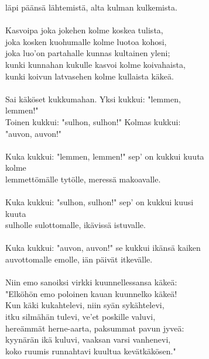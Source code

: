 läpi päänsä lähtemistä, alta kulman kulkemista.                \\
                                                               \\
Kasvoipa joka jokehen kolme koskea tulista,                    \\
joka kosken kuohumalle kolme luotoa kohosi,                    \\
joka luo'on partahalle kunnas kultainen yleni;                 \\
kunki kunnahan kukulle kasvoi kolme koivahaista,               \\
kunki koivun latvasehen kolme kullaista käkeä.                 \\
                                                               \\
Sai käköset kukkumahan. Yksi kukkui: "lemmen,                  \\
lemmen!"                                                       \\
Toinen kukkui: "sulhon, sulhon!" Kolmas kukkui:                \\
"auvon, auvon!"                                                \\
                                                               \\
Kuka kukkui: "lemmen, lemmen!" sep' on kukkui kuuta            \\
kolme                                                          \\
lemmettömälle tytölle, meressä makoavalle.                     \\
                                                               \\
Kuka kukkui: "sulhon, sulhon!" sep' on kukkui kuusi            \\
kuuta                                                          \\
sulholle sulottomalle, ikävissä istuvalle.                     \\
                                                               \\
Kuka kukkui: "auvon, auvon!" se kukkui ikänsä kaiken           \\
auvottomalle emolle, iän päivät itkevälle.                     \\
                                                               \\
Niin emo sanoiksi virkki kuunnellessansa käkeä:                \\
"Elköhön emo poloinen kauan kuunnelko käkeä!                   \\
Kun käki kukahtelevi, niin syän sykähtelevi,                   \\
itku silmähän tulevi, ve'et poskille valuvi,                   \\
hereämmät herne-aarta, paksummat pavun jyveä:                  \\
kyynärän ikä kuluvi, vaaksan varsi vanhenevi,                  \\
koko ruumis runnahtavi kuultua kevätkäkösen."                  \\